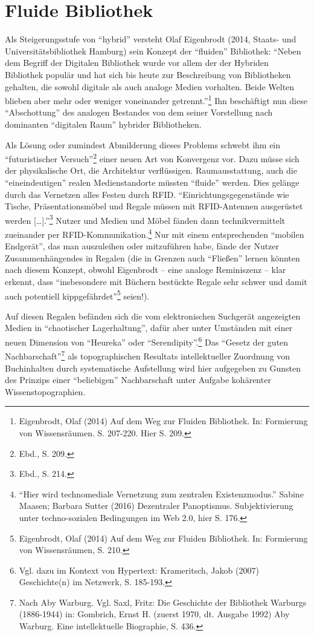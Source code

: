 \documentclass[a4paper,
fontsize=11pt,
oneside,
numbers=noperiodatend,
parskip=half-,
bibliography=totoc,
final
]{scrartcl}
\begin{document}
\section*{Fluide Bibliothek}\label{fluide-bibliothek}

Als Steigerungsstufe von \enquote{hybrid} versteht Olaf Eigenbrodt
(2014, Staats- und Universitätsbibliothek Hamburg) sein Konzept der
\enquote{fluiden} Bibliothek: \enquote{Neben dem Begriff der Digitalen
Bibliothek wurde vor allem der der Hybriden Bibliothek populär und hat
sich bis heute zur Beschreibung von Bibliotheken gehalten, die sowohl
digitale als auch analoge Medien vorhalten. Beide Welten blieben aber
mehr oder weniger voneinander getrennt.}\footnote{Eigenbrodt, Olaf
  (2014) Auf dem Weg zur Fluiden Bibliothek. In: Formierung von
  Wissensräumen. S. 207-220. Hier S. 209.} Ihn beschäftigt nun diese
\enquote{Abschottung} des analogen Bestandes von dem seiner Vorstellung
nach dominanten \enquote{digitalen Raum} hybrider Bibliotheken.

Als Lösung oder zumindest Abmilderung dieses Problems schwebt ihm ein
\enquote{futuristischer Versuch}\footnote{Ebd., S. 209.} einer neuen Art
von Konvergenz vor. Dazu müsse sich der physikalische Ort, die
Architektur verflüssigen. Raumausstattung, auch die
\enquote{eineindeutigen} realen Medienstandorte müssten \enquote{fluide}
werden. Dies gelänge durch das Vernetzen alles Festen durch RFID.
\enquote{Einrichtungsgegenstände wie Tische, Präsentationsmöbel und
Regale müssen mit RFID-Antennen ausgerüstet werden
{[}\ldots{}{]}.}\footnote{Ebd., S. 214.} Nutzer und Medien und Möbel
fänden dann technikvermittelt zueinander per
RFID-Kommunikation.\footnote{\enquote{Hier wird technomediale Vernetzung
  zum zentralen Existenzmodus.} Sabine Maasen; Barbara Sutter (2016)
  Dezentraler Panoptismus. Subjektivierung unter techno-sozialen
  Bedingungen im Web 2.0, hier S. 176.} Nur mit einem entsprechenden
\enquote{mobilen Endgerät}, das man auszuleihen oder mitzuführen habe,
fände der Nutzer Zusammenhängendes in Regalen (die in Grenzen auch
\enquote{Fließen} lernen könnten nach diesem Konzept, obwohl Eigenbrodt
-- eine analoge Reminiszenz -- klar erkennt, dass \enquote{insbesondere
mit Büchern bestückte Regale sehr schwer und damit auch potentiell
kippgefährdet}\footnote{Eigenbrodt, Olaf (2014) Auf dem Weg zur Fluiden
  Bibliothek. In: Formierung von Wissensräumen, S. 210.} seien!).

Auf diesen Regalen befänden sich die vom elektronischen Suchgerät
angezeigten Medien in \enquote{chaotischer Lagerhaltung}, dafür aber
unter Umständen mit einer neuen Dimension von \enquote{Heureka} oder
\enquote{Serendipity}.\footnote{Vgl. dazu im Kontext von Hypertext:
  Krameritsch, Jakob (2007) Geschichte(n) im Netzwerk, S. 185-193.} Das
\enquote{Gesetz der guten Nachbarschaft}\footnote{Nach Aby Warburg. Vgl.
  Saxl, Fritz: Die Geschichte der Bibliothek Warburgs (1886-1944) in:
  Gombrich, Ernst H. (zuerst 1970, dt. Ausgabe 1992) Aby Warburg. Eine
  intellektuelle Biographie, S. 436.} als topographischen Resultats
intellektueller Zuordnung von Buchinhalten durch systematische
Aufstellung wird hier aufgegeben zu Gunsten des Prinzips einer
\enquote{beliebigen} Nachbarschaft unter Aufgabe kohärenter
Wissenstopographien.
\end{document}
